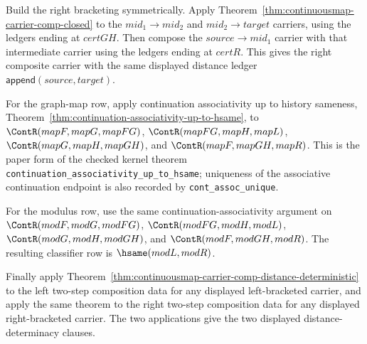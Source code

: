 Build the right bracketing symmetrically. Apply
Theorem~\ref{thm:continuousmap-carrier-comp-closed} to the
$mid_1 \to mid_2$ and $mid_2 \to target$ carriers, using the ledgers ending at
$certGH$. Then compose the $source \to mid_1$ carrier with that intermediate
carrier using the ledgers ending at $certR$. This gives the right composite
carrier with the same displayed distance ledger
$\mathsf{append}(source,target)$.

For the graph-map row, apply continuation associativity up to history
sameness, Theorem~\ref{thm:continuation-associativity-up-to-hsame}, to
$\ContR(mapF,mapG,mapFG)$, $\ContR(mapFG,mapH,mapL)$,
$\ContR(mapG,mapH,mapGH)$, and $\ContR(mapF,mapGH,mapR)$. This is the paper
form of the checked kernel theorem
\texttt{continuation\_associativity\_up\_to\_hsame}; uniqueness of the
associative continuation endpoint is also recorded by
\texttt{cont\_assoc\_unique}.

For the modulus row, use the same continuation-associativity argument on
$\ContR(modF,modG,modFG)$, $\ContR(modFG,modH,modL)$,
$\ContR(modG,modH,modGH)$, and $\ContR(modF,modGH,modR)$. The resulting
classifier row is $\hsame(modL,modR)$.

Finally apply
Theorem~\ref{thm:continuousmap-carrier-comp-distance-deterministic} to the
left two-step composition data for any displayed left-bracketed carrier, and
apply the same theorem to the right two-step composition data for any
displayed right-bracketed carrier. The two applications give the two displayed
distance-determinacy clauses.
